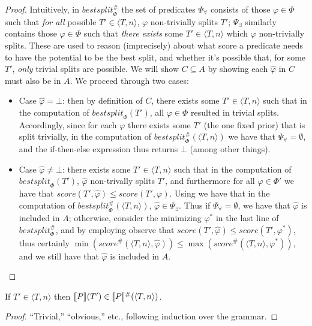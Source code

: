 \begin{proof}
Intuitively, in $\mathit{bestsplit}^\#_\Phi$ the set of predicates
$\Psi_\forall$ consists of those $\varphi \in \Phi$
such that \emph{for all} possible $T' \in \langle T, n \rangle$,
$\varphi$ non-trivially splits $T'$;
$\Psi_\exists$ similarly contains those $\varphi \in \Phi$
such that \emph{there exists} some $T' \in \langle T, n \rangle$
which $\varphi$ non-trivially splits.
These are used to reason (imprecisely) about
\rone what score a predicate needs to have the potential to be the best split, and
\rtwo whether it's possible that, for some $T'$, \emph{only} trivial splits are possible.
We will show $C \subseteq A$ by showing each $\hat{\varphi}$ in $C$ must also be in $A$.
We proceed through two cases:
\begin{itemize}
    \item Case $\hat{\varphi} = \bot$:
        then by definition of $C$, there exists some $T' \in \langle T, n \rangle$
        such that in the computation of $\mathit{bestsplit}_\Phi(T')$,
        all $\varphi \in \Phi$ resulted in trivial splits.
        Accordingly, since for each $\varphi$ there exists some $T'$ (the one fixed prior)
        that is split trivially, in the computation of
        $\mathit{bestsplit}^\#_\Phi(\langle T, n \rangle)$
        we have that $\Psi_\forall = \emptyset$,
        and the if-then-else expression thus returns $\bot$ (among other things).
    \item Case $\hat{\varphi} \neq \bot$:
        there exists some $T' \in \langle T, n \rangle$
        such that in the computation of $\mathit{bestsplit}_\Phi(T')$,
        \rone $\hat{\varphi}$ non-trivally splits $T'$, and furthermore
        \rtwo for all $\varphi \in \Phi'$ we have that
        $\mathit{score}(T', \hat{\varphi}) \leq \mathit{score}(T', \varphi)$.
        Using \rone we have that in the computation of $\mathit{bestsplit}^\#_\Phi(\langle T, n \rangle)$,
        $\hat{\varphi} \in \Psi_\exists$.
        Thus if $\Psi_\forall = \emptyset$, we have that $\hat{\varphi}$ is included in $A$;
        otherwise, consider the minimizing $\varphi^*$ in the last line of $\mathit{bestsplit}^\#_\Phi$,
        and by employing \rtwo observe that $\mathit{score}(T', \hat{\varphi}) \leq \mathit{score}(T', \varphi^*)$,
        thus certainly $\min(\mathit{score}^\#(\langle T, n \rangle, \hat{\varphi})) \leq
        \max(\mathit{score}^\#(\langle T, n \rangle, \varphi^*))$,
        and we still have that $\hat{\varphi}$ is included in $A$.
\end{itemize}
\end{proof}
\begin{theorem}[Soundness]
If $T' \in \langle T, n \rangle$ then $\den{P}(T') \in \den{P}^\#(\langle T, n \rangle)$.
\end{theorem}
\begin{proof}
``Trivial,'' ``obvious,'' etc., following induction over the grammar.
\end{proof}
